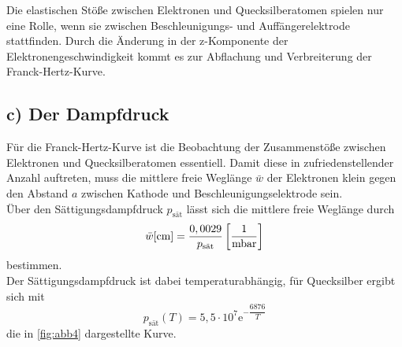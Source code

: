 Die elastischen Stöße zwischen Elektronen und Quecksilberatomen spielen nur eine Rolle, wenn sie zwischen
Beschleunigungs- und Auffängerelektrode stattfinden.
Durch die Änderung in der z-Komponente der Elektronengeschwindigkeit kommt es zur Abflachung und Verbreiterung
der Franck-Hertz-Kurve.


\subsection*{c) Der Dampfdruck}

Für die Franck-Hertz-Kurve ist die Beobachtung der Zusammenstöße zwischen Elektronen und Quecksilberatomen
essentiell.
Damit diese in zufriedenstellender Anzahl auftreten, muss die mittlere freie Weglänge $\bar{w}$ der Elektronen
klein gegen den Abstand $a$ zwischen Kathode und Beschleunigungselektrode sein. \\

Über den Sättigungsdampfdruck $p_\text{sät}$ lässt sich die mittlere freie Weglänge durch
\begin{equation}
    \bar{w} [\unit{\centi\meter}] = \frac{0,0029}{p_\text{sät}} \left[\unit{\frac{1}{\milli\bar}} \right]
    \label{eq:mittfreiweg}
\end{equation}
bestimmen. \\

Der Sättigungsdampfdruck ist dabei temperaturabhängig, für Quecksilber ergibt sich mit
\begin{equation*}
    p_\text{sät} (T) = 5,5 \cdot 10^7 \text{e}^{-\dfrac{6876}{T}}
\end{equation*}
die in \autoref{fig:abb4} dargestellte Kurve.

